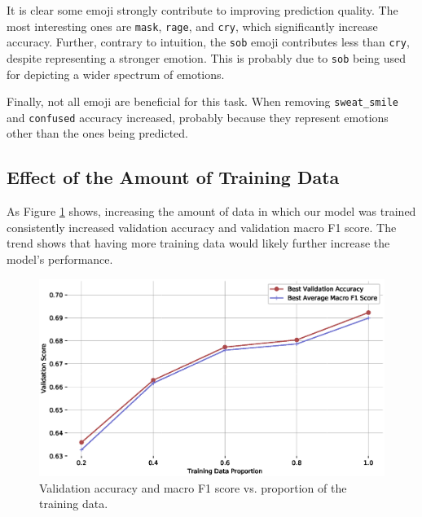 \documentclass[11pt,a4paper]{article}
\begin{document}
It is clear some emoji strongly contribute to improving prediction quality. The most interesting ones are \texttt{mask}, \texttt{rage}, and \texttt{cry}, which significantly increase accuracy. Further, contrary to intuition, the \texttt{sob} emoji contributes less than \texttt{cry}, despite representing a stronger emotion. This is probably due to \texttt{sob} being used for depicting a wider spectrum of emotions.

Finally, not all emoji are beneficial for this task. When removing \texttt{sweat\_smile} and \texttt{confused} accuracy increased, probably because they represent emotions other than the ones being predicted.



\subsection{Effect of the Amount of Training Data}

As Figure \ref{fig:data_amt_vs_acc} shows, increasing the amount of data in which our model was trained consistently increased validation accuracy and validation macro F1 score. The trend shows that having more training data would likely further increase the model's performance.

\begin{figure}[!h]
    \centering
    \includegraphics[width=\columnwidth]{images/acc_vs_tdp_variation.eps}
    \caption{Validation accuracy and macro F1 score vs. proportion of the training data.}
    \label{fig:data_amt_vs_acc}
\end{figure}
\end{document}
